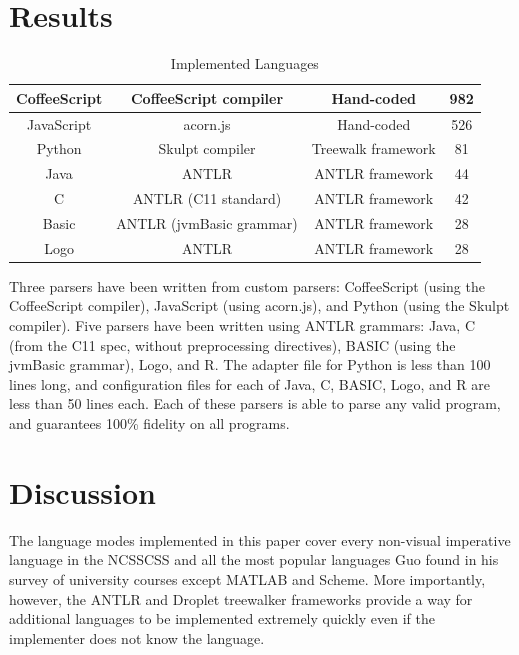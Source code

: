 \documentclass[conference]{IEEEtran}
\begin{document}
\section{Results}
\begin{table}[!t]
  \renewcommand{\arraystretch}{1.3}
  \caption{Implemented Languages}
  \label{impl_lang}
  \centering
  \begin{tabular}{|c|c|c|c|}
    \hline
    CoffeeScript & CoffeeScript compiler & Hand-coded & 982\\
    \hline
    JavaScript & acorn.js & Hand-coded & 526\\
    \hline
    Python & Skulpt compiler & Treewalk framework & 81\\
    \hline
    Java & ANTLR & ANTLR framework & 44\\
    \hline
    C & ANTLR (C11 standard) & ANTLR framework & 42\\
    \hline
    Basic & ANTLR (jvmBasic grammar) & ANTLR framework & 28\\
    \hline
    Logo & ANTLR & ANTLR framework & 28\\
    \hline
  \end{tabular}
\end{table}

Three parsers have been written from custom parsers: CoffeeScript (using the CoffeeScript compiler), JavaScript (using acorn.js), and Python (using the Skulpt compiler). Five parsers have been written using ANTLR grammars: Java, C (from the C11 spec, without preprocessing directives), BASIC (using the jvmBasic grammar), Logo, and R. The adapter file for Python is less than 100 lines long, and configuration files for each of Java, C, BASIC, Logo, and R are less than 50 lines each. Each of these parsers is able to parse any valid program, and guarantees 100\% fidelity on all programs.

\section{Discussion}
The language modes implemented in this paper cover every non-visual imperative language in the NCSSCSS and all the most popular languages Guo found in his survey of university courses except MATLAB and Scheme. More importantly, however, the ANTLR and Droplet treewalker frameworks provide a way for additional languages to be implemented extremely quickly even if the implementer does not know the language.
\end{document}
